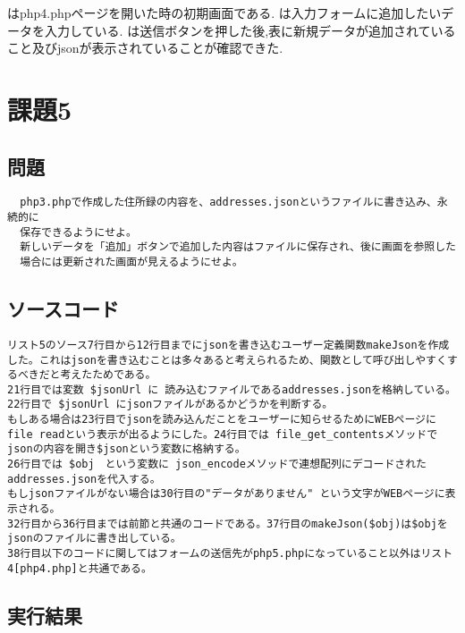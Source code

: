 \documentclass[a4j,10pt]{jsarticle}
\begin{document}
はphp4.phpページを開いた時の初期画面である.
は入力フォームに追加したいデータを入力している.
は送信ボタンを押した後,表に新規データが追加されていること及びjsonが表示されていることが確認できた.
\section{課題5}

\subsection{問題}

\begin{verbatim}
  php3.phpで作成した住所録の内容を、addresses.jsonというファイルに書き込み、永続的に
  保存できるようにせよ。
  新しいデータを「追加」ボタンで追加した内容はファイルに保存され、後に画面を参照した
  場合には更新された画面が見えるようにせよ。

\end{verbatim}
\subsection{ソースコード}


\begin{verbatim}
リスト5のソース7行目から12行目までにjsonを書き込むユーザー定義関数makeJsonを作成した。これはjsonを書き込むことは多々あると考えられるため、関数として呼び出しやすくするべきだと考えたためである。
21行目では変数 $jsonUrl に 読み込むファイルであるaddresses.jsonを格納している。22行目で $jsonUrl にjsonファイルがあるかどうかを判断する。
もしある場合は23行目でjsonを読み込んだことをユーザーに知らせるためにWEBページにfile readという表示が出るようにした。24行目では file_get_contentsメソッドでjsonの内容を開き$jsonという変数に格納する。
26行目では $obj　という変数に json_encodeメソッドで連想配列にデコードされたaddresses.jsonを代入する。
もしjsonファイルがない場合は30行目の"データがありません" という文字がWEBページに表示される。
32行目から36行目までは前節と共通のコードである。37行目のmakeJson($obj)は$objをjsonのファイルに書き出している。
38行目以下のコードに関してはフォームの送信先がphp5.phpになっていること以外はリスト4[php4.php]と共通である。

\end{verbatim}
\subsection{実行結果}
\end{document}
